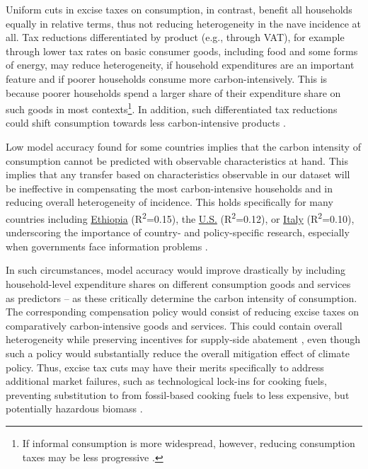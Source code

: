 \documentclass[12pt, a4paper]{article}
\begin{document}
Uniform cuts in excise taxes on consumption, in contrast, benefit all households equally in relative terms, thus not reducing heterogeneity in the nave incidence at all. Tax reductions differentiated by product (e.g., through VAT), for example through lower tax rates on basic consumer goods, including food and some forms of energy, may reduce heterogeneity, if household expenditures are an important feature and if poorer households consume more carbon-intensively. This is because poorer households spend a larger share of their expenditure share on such goods in most contexts\footnote{If informal consumption is more widespread, however, reducing consumption taxes may be less progressive \autocite{Bachas.2020}.}. In addition, such differentiated tax reductions could shift consumption towards less carbon-intensive products \autocite{Klenert.2023}.


Low model accuracy found for some countries implies that the carbon intensity of consumption cannot be predicted with observable characteristics at hand. This implies that any transfer based on characteristics observable in our dataset will be ineffective in compensating the most carbon-intensive households and in reducing overall heterogeneity of incidence. This holds specifically for many countries including \hyperref[fig:5b_ETH]{Ethiopia} (R\textsuperscript{2}=0.15), the \hyperref[fig:5b_USA]{U.S.} (R\textsuperscript{2}=0.12), or \hyperref[fig:5b_ITA]{Italy} (R\textsuperscript{2}=0.10), underscoring the importance of country- and policy-specific research, especially when governments face information problems \autocite{Mirrlees.1971}.

In such circumstances, model accuracy would improve drastically by including household-level expenditure shares on different consumption goods and services as predictors -- as these critically determine the carbon intensity of consumption. The corresponding compensation policy would consist of reducing excise taxes on comparatively carbon-intensive goods and services. This could contain overall heterogeneity while preserving incentives for supply-side abatement \autocite{Goulder.2008}, even though such a policy would substantially reduce the overall mitigation effect of climate policy. Thus, excise tax cuts may have their merits specifically to address additional market failures, such as technological lock-ins for cooking fuels, preventing substitution to from fossil-based cooking fuels to less expensive, but potentially hazardous biomass \autocite{Greve.2022}. 
\end{document}
